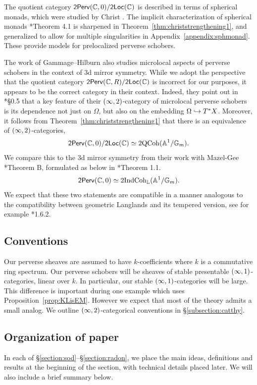 The quotient category $\mathsf{2Perv}(\mathbb{C},0)/\mathsf{2Loc}(\mathbb{C})$ is described in terms of spherical monads, which were studied by Christ \cite{christSphericalMonadicAdjunctions2023}. The implicit characterization of spherical monads \cite{christSphericalMonadicAdjunctions2023}*{Theorem 4.1} is sharpened in Theorem~\ref{thm:christstrengthening1}, and generalized to allow for multiple singularities in Appendix~\ref{appendix:sphmonad}. These provide models for prelocalized perverse schobers.

The work of Gammage--Hilburn \cite{gammageHypertoric2categoriesSymplectic2025} also studies microlocal aspects of perverse schobers in the context of 3d mirror symmetry. While we adopt the perspective that the quotient category $\mathsf{2Perv}(\mathbb{C},R)/\mathsf{2Loc}(\mathbb{C})$ is incorrect for our purposes, it appears to be the correct category in their context. Indeed, they point out in \cite{gammageHypertoric2categoriesSymplectic2025}*{\S 0.5} that a key feature of their $(\infty,2)$-category of microlocal perverse schobers is its dependence not just on $\Omega$, but also on the embedding $\Omega\hookrightarrow T^*X$. Moreover, it follows from Theorem~\ref{thm:christstrengthening1} that there is an equivalence of $(\infty,2)$-categories,
\[\mathsf{2Perv}(\mathbb{C},0)/\mathsf{2Loc}(\mathbb{C})\simeq \operatorname{2QCoh}(\mathbb{A}^1/\mathbb{G}_m).\]
We compare this to the 3d mirror symmetry from their work with Mazel-Gee \cite{gammagePerverseSchobers3d2023}*{Theorem B}, formulated as below in \cite{gammageBettiTatesThesis2025}*{Theorem 1.1}.
\[\mathsf{2Perv}(\mathbb{C},0)\simeq \operatorname{2IndCoh}_{\mathbb{L}}(\mathbb{A}^1/\mathbb{G}_m).\]
We expect that these two statements are compatible in a manner analogous to the compatibility between geometric Langlands and its tempered version, see for example \cite{faergemanNonvanishingGeometricWhittaker2022}*{1.6.2}.

\subsection{Conventions}
Our perverse sheaves are assumed to have $k$-coefficients where $k$ is a commutative ring spectrum. Our perverse schobers will be sheaves of stable presentable $(\infty,1)$-categories, linear over $k$. In particular, our stable $(\infty,1)$-categories will be large. This difference is important during one example which uses Proposition~\ref{prop:KLisEM}. However we expect that most of the theory admits a small analog. We outline $(\infty,2)$-categorical conventions in \S\ref{subsection:catthy}.

\subsection{Organization of paper}
In each of \S\ref{section:sod}--\S\ref{section:radon}, we place the main ideas, definitions and results at the beginning of the section, with technical details placed later. We will also include a brief summary below.

